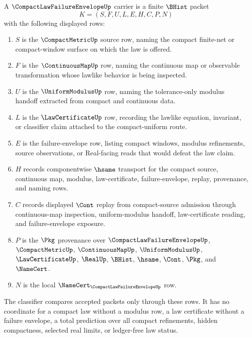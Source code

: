 \begin{definition}
\label{def:compact-law-failure-envelope-carrier}
A $\CompactLawFailureEnvelopeUp$ carrier is a finite $\BHist$ packet
$$
K=(S,F,U,L,E,H,C,P,N)
$$
with the following displayed rows:
\begin{enumerate}
\item $S$ is the $\CompactMetricUp$ source row, naming the compact finite-net or compact-window surface on which the law is offered.
\item $F$ is the $\ContinuousMapUp$ row, naming the continuous map or observable transformation whose lawlike behavior is being inspected.
\item $U$ is the $\UniformModulusUp$ row, naming the tolerance-only modulus handoff extracted from compact and continuous data.
\item $L$ is the $\LawCertificateUp$ row, recording the lawlike equation, invariant, or classifier claim attached to the compact-uniform route.
\item $E$ is the failure-envelope row, listing compact windows, modulus refinements, source observations, or Real-facing reads that would defeat the law claim.
\item $H$ records componentwise $\hsame$ transport for the compact source, continuous map, modulus, law-certificate, failure-envelope, replay, provenance, and naming rows.
\item $C$ records displayed $\Cont$ replay from compact-source admission through continuous-map inspection, uniform-modulus handoff, law-certificate reading, and failure-envelope exposure.
\item $P$ is the $\Pkg$ provenance over $\CompactLawFailureEnvelopeUp$, $\CompactMetricUp$, $\ContinuousMapUp$, $\UniformModulusUp$, $\LawCertificateUp$, $\RealUp$, $\BHist$, $\hsame$, $\Cont$, $\Pkg$, and $\NameCert$.
\item $N$ is the local $\NameCert_{\CompactLawFailureEnvelopeUp}$ row.
\end{enumerate}
The classifier compares accepted packets only through these rows. It has no coordinate for a compact law without a modulus row, a law certificate without a failure envelope, a total prediction over all compact refinements, hidden compactness, selected real limits, or ledger-free law status.
\end{definition}

